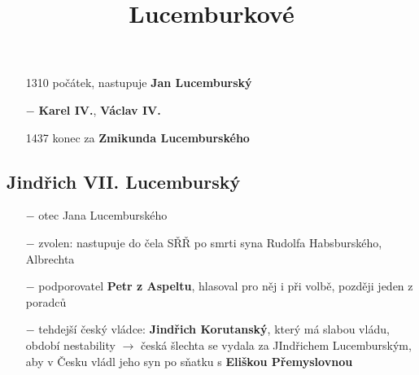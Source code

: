 \documentclass{article}
\title{\vspace{-2cm}Lucemburkové\vspace{-1.7cm}}
\date{}
\author{}
\begin{document}
\maketitle

\begin{itemize}
    \vspace{-0.5em}
    \setlength\itemsep{0.15em}
    \item[1310] počátek, nastupuje \textbf{Jan Lucemburský}
    \item[$-$] \textbf{Karel IV.}, \textbf{Václav IV.}
    \item[1437] konec za \textbf{Zmikunda Lucemburského}
\end{itemize}

\subsection*{Jindřich VII. Lucemburský}
\begin{itemize}
    \vspace{-0.5em}
    \setlength\itemsep{0.15em}
    \item[$-$] otec Jana Lucemburského
    \item[$-$] zvolen: nastupuje do čela SŘŘ po smrti syna Rudolfa Habsburského, Albrechta
    \item[$-$] podporovatel \textbf{Petr z Aspeltu}, hlasoval pro něj i při volbě, později jeden z poradců
    \item[$-$] tehdejší český vládce: \textbf{Jindřich Korutanský}, který má slabou vládu, období nestability $\rightarrow$ česká šlechta se vydala za JIndřichem Lucemburským, aby v Česku vládl jeho syn po sňatku s \textbf{Eliškou Přemyslovnou}
\end{itemize}
\end{document}
